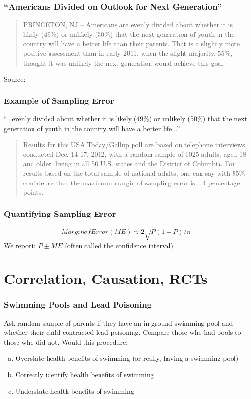 \documentclass{beamer}
\begin{document}
\begin{frame}
\frametitle{``Americans Divided on Outlook for Next Generation''}
	\vspace{1em}
	\begin{quote}
		PRINCETON, NJ -- Americans are evenly divided about whether it is likely (49\%) or unlikely 			(50\%) that the next generation of youth in the country will have a better life than their 				parents. That is a slightly more positive assessment than in early 2011, when the slight 				majority, 55\%, thought it was unlikely the next generation would achieve this goal.
	\end{quote}
	\tiny{Source: \href{http://www.gallup.com/poll/159737/americans-divided-outlook-next-generation.aspx}{}}	
\end{frame}

\begin{frame}
\frametitle{Example of Sampling Error}
	``...evenly divided about whether it is likely (49\%) or unlikely (50\%) that the next generation 		of youth in the country will have a better life...''
	\vspace{2em}
	\begin{quote}
		Results for this USA Today/Gallup poll are based on telephone interviews conducted Dec. 			14-17, 2012, with a \alert{random sample of 1025 adults}, aged 18 and older, living in all 50 			U.S. states and the District of Columbia. For results based on the total sample of national 			adults, one can say with \alert{95\% confidence that the maximum margin of sampling 				error is ±4 percentage points}.
	\end{quote}
\end{frame}

\begin{frame}
\frametitle{Quantifying Sampling Error}
	$$Margin of Error (ME) \approx 2 \sqrt{P(1-P)/n}$$
	We report: $P \pm ME$ (often called the confidence interval)
\end{frame}

\section{Correlation, Causation, RCTs}
\begin{frame}
\frametitle{Swimming Pools and Lead Poisoning}
	Ask random sample of parents if they have an in-ground swimming pool and whether their   			child contracted lead poisoning. Compare those who had pools to those who did not.
	\vspace{1em}
	Would this procedure:
		\begin{enumerate}[(a)]
			\item Overstate health benefits of swimming (or really, having a swimming pool)
			\item Correctly identify health benefits of swimming
			\item Understate health benefits of swimming
		\end{enumerate}
\end{frame}
\end{document}
